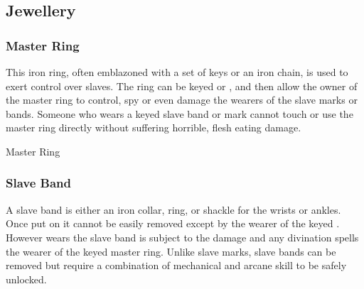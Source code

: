 \subsection{Jewellery}
\label{sec:Jewellery}

\subsubsection{Master Ring}
\label{sec:Master Ring}

This iron ring, often emblazoned with a set of keys or an iron chain, is used
to exert control over slaves. The ring can be keyed 
or , and then allow the owner of the master ring to
control, spy or even damage the wearers of the slave marks or bands. Someone
who wears a keyed slave band or mark cannot touch or use the master ring
directly without suffering horrible, flesh eating damage.

\begin{35e}{Master Ring}
\end{35e}

\subsubsection{Slave Band}
\label{sec:Slave Band}

A slave band is either an iron collar, ring, or shackle for the wrists or
ankles. Once put on it cannot be easily removed except by the wearer of the
keyed . However wears the slave band is subject to
the damage and any divination spells the wearer of the keyed master ring.
Unlike slave marks, slave bands can be removed but require a combination of
mechanical and arcane skill to be safely unlocked.

